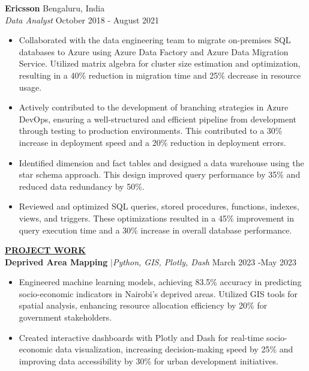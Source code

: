 \documentclass{article}
\begin{document}
\noindent \textbf{Ericsson} \hfill Bengaluru, India \\
\textit{Data Analyst} \hfill October 2018 - August 2021
\begin{itemize}[noitemsep,nolistsep,leftmargin=*]
\item {Collaborated with the data engineering team to migrate on-premises SQL databases to Azure using Azure Data Factory and Azure Data Migration Service. Utilized matrix algebra for cluster size estimation and optimization, resulting in a 40\% reduction in migration time and 25\% decrease in resource usage.}
\item {Actively contributed to the development of branching strategies in Azure DevOps, ensuring a well-structured and efficient pipeline from development through testing to production environments. This contributed to a 30\% increase in deployment speed and a 20\% reduction in deployment errors.}
\item { Identified dimension and fact tables and designed a data warehouse using the star schema approach. This design improved query performance by 35\% and reduced data redundancy by 50\%.}
\item {Reviewed and optimized SQL queries, stored procedures, functions, indexes, views, and triggers. These optimizations resulted in a 45\% improvement in query execution time and a 30\% increase in overall database performance.\\}

\end{itemize}


%
%
\noindent \textbf{\underline{PROJECT WORK}} \\
\noindent \textbf{Deprived Area Mapping} $\mid$\textit{Python, GIS, Plotly, Dash} \hfill  March 2023 -May 2023
\begin{itemize}[noitemsep,nolistsep,leftmargin=*]
\item {Engineered machine learning models, achieving 83.5\% accuracy in predicting socio-economic indicators in Nairobi's deprived areas. Utilized GIS tools for spatial analysis, enhancing resource allocation efficiency by 20\% for government stakeholders.}
\item {Created interactive dashboards with Plotly and Dash for real-time socio-economic data visualization, increasing decision-making speed by 25\% and improving data accessibility by 30\% for urban development initiatives.}
\end{itemize}
\end{document}

